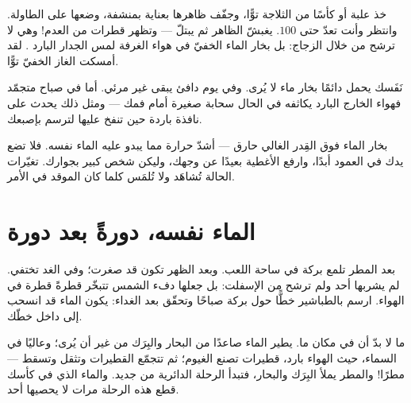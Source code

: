 \begin{example}\label{ex:g2:ice-water-steam:catch}
خذ علبة أو كأسًا من الثلاجة توًّا، وجفّف ظاهرها بعناية بمنشفة،
وضعها على الطاولة. وانتظر وأنت تعدّ حتى $100$. يغبشّ الظاهر ثم
يبتلّ --- وتظهر قطرات من العدم! وهي لا ترشح من خلال الزجاج: بل
بخار الماء الخفيّ في هواء الغرفة لمس الجدار البارد . لقد
أمسكت الغاز الخفيّ توًّا.
\end{example}

\begin{example}\label{ex:g2:ice-water-steam:breath}
نَفَسك يحمل دائمًا بخار ماء لا يُرى. وفي يوم دافئ يبقى غير مرئي.
أما في صباح متجمّد فهواء الخارج البارد يكاثفه في الحال سحابة
صغيرة أمام فمك --- ومثل ذلك يحدث على نافذة باردة حين تنفخ عليها
لترسم بإصبعك.
\end{example}

\begin{remark}\label{rem:g2:ice-water-steam:safety}
بخار الماء فوق القِدر الغالي حارق --- أشدّ حرارة مما يبدو عليه
الماء نفسه. فلا تضع يدك في العمود أبدًا، وارفع الأغطية بعيدًا عن
وجهك، وليكن شخص كبير بجوارك. تغيّرات الحالة تُشاهَد ولا تُلمَس
كلما كان الموقد في الأمر.
\end{remark}

\section{الماء نفسه، دورةً بعد دورة}

\begin{example}\label{ex:g2:ice-water-steam:puddle}
بعد المطر تلمع بركة في ساحة اللعب. وبعد الظهر تكون قد صغرت؛ وفي
الغد تختفي. لم يشربها أحد ولم ترشح من الإسفلت: بل جعلها دفء الشمس
تتبخّر قطرةً قطرة في الهواء. ارسم بالطباشير خطًّا حول بركة صباحًا
وتحقّق بعد الغداء: يكون الماء قد انسحب إلى داخل خطّك.
\end{example}

\begin{example}\label{ex:g2:ice-water-steam:cycle}
ما  لا بدّ أن  في مكان ما. يطير الماء صاعدًا من البحار
والبِرَك من غير أن يُرى؛ وعاليًا في السماء، حيث الهواء بارد،
 قطيرات تصنع الغيوم؛ ثم تتجمّع القطيرات وتثقل وتسقط ---
مطرًا! والمطر يملأ البِرَك والبحار، فتبدأ الرحلة الدائرية من
جديد. والماء الذي في كأسك قطع هذه الرحلة مرات لا يحصيها أحد.
\end{example}

